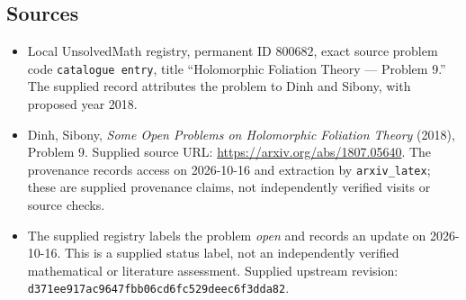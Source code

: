 \documentclass[11pt]{article}
\begin{document}
\subsection{Sources}
\begin{itemize}
\item Local UnsolvedMath registry, permanent ID \(800682\), exact source problem code \texttt{catalogue entry}, title ``Holomorphic Foliation Theory --- Problem 9.'' The supplied record attributes the problem to Dinh and Sibony, with proposed year 2018.
\item Dinh, Sibony, \emph{Some Open Problems on Holomorphic Foliation Theory} (2018), Problem 9. Supplied source URL: \url{https://arxiv.org/abs/1807.05640}. The provenance records access on 2026-10-16 and extraction by \texttt{arxiv\_latex}; these are supplied provenance claims, not independently verified visits or source checks.
\item The supplied registry labels the problem \emph{open} and records an update on 2026-10-16. This is a supplied status label, not an independently verified mathematical or literature assessment. Supplied upstream revision: \texttt{d371ee917ac9647fbb06cd6fc529deec6f3dda82}.
\end{itemize}
\end{document}
